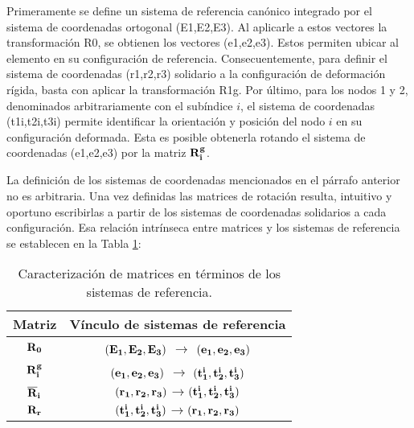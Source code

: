 Primeramente se define un sistema de referencia canónico integrado por el sistema de coordenadas ortogonal (\gls{E1},\gls{E2},\gls{E3}). Al aplicarle a estos vectores la transformación \gls{R0}, se obtienen los vectores (\gls{e1},\gls{e2},\gls{e3}). Estos permiten ubicar al elemento en su configuración de referencia. Consecuentemente, para definir el sistema de coordenadas (\gls{r1},\gls{r2},\gls{r3}) solidario a la configuración de deformación rígida, basta con aplicar la transformación \gls{R1g}. Por último, para los nodos 1 y 2, denominados arbitrariamente con el subíndice $i$, el sistema de coordenadas (\gls{t1i},\gls{t2i},\gls{t3i}) permite identificar la orientación y posición del nodo $i$ en su configuración deformada. Esta es posible obtenerla rotando el sistema de coordenadas (\gls{e1},\gls{e2},\gls{e3}) por la matriz $\bf{R}_i^g$. 



La definición de los sistemas de coordenadas mencionados en el párrafo anterior no es arbitraria. Una vez definidas las matrices de rotación resulta, intuitivo y oportuno escribirlas a partir de los sistemas de coordenadas solidarios a cada configuración. Esa relación intrínseca entre matrices y los sistemas de referencia se establecen en la Tabla \ref{Table:PRE:RelacionVM}:

\begin{table}[htbp]
	\begin{center}
		\begin{tabular}{|c|c|}
			\hline
			Matriz & Vínculo de sistemas de referencia \\
			\hline \hline
			$\bf{R}_0$ &$(\bf{E_1},\bf{E_2},\bf{E_3})$ $\rightarrow$
			$(\bf{e_1},\bf{e_2},\bf{e_3})$   \\ \hline
			$\bf{R}_i^g$ & $(\bf{e_1},\bf{e_2},\bf{e_3})$ $\rightarrow$
			$(\bf{t_1^i},\bf{t_2^i},\bf{t_3^i})$ \\ \hline
			$\bf{\overline{R}}_i$ &
			$(\bf{r_1},\bf{r_2},\bf{r_3})$$\rightarrow$$(\bf{t_1^i},\bf{t_2^i},\bf{t_3^i})$
			\\ \hline
			$\bf{R}_r$ &
		$(\bf{t_1^i},\bf{t_2^i},\bf{t_3^i})$$\rightarrow$$(\bf{r_1},\bf{r_2},\bf{r_3})$ \\
			\hline
		\end{tabular}
		\caption{Caracterización de matrices en términos de los sistemas de referencia.}
		\label{Table:PRE:RelacionVM}
	\end{center}
\end{table}


